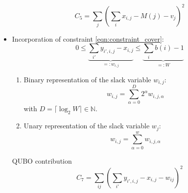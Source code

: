 \documentclass{article}
\begin{document}
\begin{itemize}
\begin{equation*}
        C_5 = \sum_j \left( \sum_i x_{i,j} - M(j) -  v_j \right)^2
    \end{equation*}
\item Incorporation of constraint \eqref{eqn:constraint_cover}:
    \begin{equation*}
        0 \leq \underbrace{\sum_{i'} y_{i', i, j} - x_{i, j}}_{=:w_{i, j}} \leq \underbrace{\sum_i b(i) - 1}_{=:W}
    \end{equation*}
    \begin{enumerate}
        \item 
        Binary representation of the slack variable $w_{i, j}$:
        \begin{equation*}
            w_{i, j} = \sum_{\alpha = 0}^{D} 2^\alpha w_{i, j, \alpha}
        \end{equation*}
        with $D = \lceil \log_2 W \rceil \in \mathbb{N}$.
        \item 
        Unary representation of the slack variable $w_j$:
        \begin{equation*}
            w_{i, j} = \sum_{\alpha = 0}^{w} w_{i, j, \alpha}
        \end{equation*}
    \end{enumerate}
    QUBO contribution
    \begin{equation*}
        C_7 = \sum_{ij} \left(\sum_{i'} y_{i', i, j} - x_{i, j} -  w_{ij} \right)^2
    \end{equation*}
\end{itemize}
\end{document}
